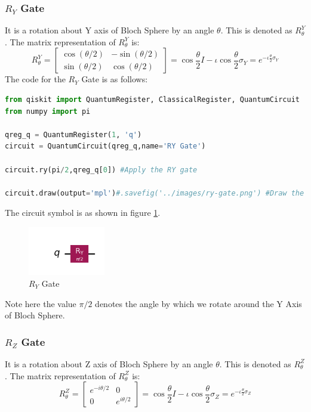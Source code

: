 \documentclass[12pt, oneside]{book}
\theoremstyle{definition}
\theoremstyle{definition}
\theoremstyle{remark}
\begin{document}
\subsubsection{$R_Y$ Gate}
It is a rotation about Y axis of Bloch Sphere by an angle $\theta$. This is denoted
as $R^{Y}_{\theta}$.
The matrix representation of $R^{Y}_{\theta}$ is:
\[
    R^{Y}_{\theta}=\begin{bmatrix}
        \cos(\theta/2) & -\sin(\theta/2) \\
        \sin(\theta/2) & \cos(\theta/2)
    \end{bmatrix}= \cos \frac{\theta}{2}I-\iota \cos \frac{\theta}{2}\sigma_Y=e^{-\iota \frac{\theta}{2}\sigma_Y}
\]
The code for the $R_Y$ Gate is as follows:
\begin{lstlisting}[language=Python]
from qiskit import QuantumRegister, ClassicalRegister, QuantumCircuit
from numpy import pi

qreg_q = QuantumRegister(1, 'q')
circuit = QuantumCircuit(qreg_q,name='RY Gate')

circuit.ry(pi/2,qreg_q[0]) #Apply the RY gate

circuit.draw(output='mpl')#.savefig('../images/ry-gate.png') #Draw the circuit
\end{lstlisting}

The circuit symbol is as shown in figure \ref{fig:ry}.
\begin{figure}[H]
    \centering
    \includegraphics[width=0.3\textwidth]{../images/ry-gate.png}
    \caption{$R_Y$ Gate}
    \label{fig:ry}
\end{figure}
Note here the value $\pi/2$ denotes the angle by which we rotate around the Y Axis of Bloch Sphere.

\subsubsection{$R_Z$ Gate}
It is a rotation about Z axis of Bloch Sphere by an angle $\theta$. This is denoted
as $R^{Z}_{\theta}$.
The matrix representation of $R^{Z}_{\theta}$ is:
\[
    R^{Z}_{\theta}=\begin{bmatrix}
        e^{-i\theta/2} & 0 \\
        0 & e^{i\theta/2}
    \end{bmatrix}=\cos \frac{\theta}{2}I-\iota \cos \frac{\theta}{2}\sigma_Z=e^{-\iota \frac{\theta}{2}\sigma_Z}
\]
\end{document}
